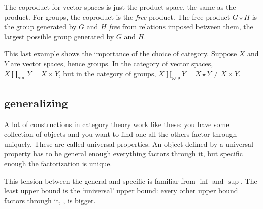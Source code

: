 \documentclass[a5paper]{scrartcl}
\def\grp{\texttt{grp}}
\def\veccat{\texttt{vec}}
\begin{document}
The coproduct for vector spaces is just the product space, the same as the product. For groups, the coproduct is the \emph{free} product. The free product \(G\star H\) is the group generated by \(G\) and \(H\) \emph{free} from relations imposed between them, the largest possible group generated by \(G\) and \(H\).

This last example shows the importance of the choice of category. Suppose \(X\) and \(Y\) are vector spaces, hence groups. In the category of vector spaces, \(X\amalg_\veccat Y = X \times Y\), but in the category of groups, \(X\amalg_\grp Y =X\star Y \neq X \times Y\).

\subsection{generalizing}
\begin{defn}
  A lot of constructions in category theory work like these: you have some collection of objects and you want to find one all the others factor through uniquely. These are called universal properties. An object defined by a universal property has to be general enough everything factors through it, but specific enough the factorization is unique.
\end{defn}
This tension between the general and specific is familiar from \(\inf\) and \(\sup\). The least upper bound is the `universal' upper bound: every other upper bound factors through it, \ie, is bigger.
\end{document}
